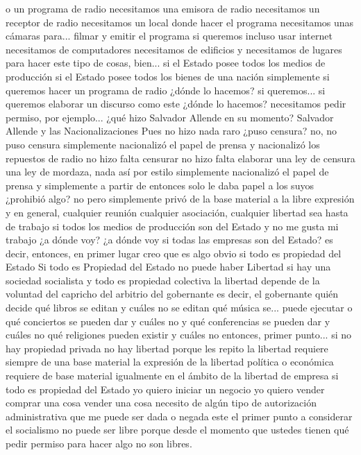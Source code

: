 o un programa de radio necesitamos una emisora de radio necesitamos un receptor de radio necesitamos un local donde hacer el programa
necesitamos unas cámaras para... filmar y emitir el programa si queremos incluso usar internet necesitamos de computadores
necesitamos de edificios y necesitamos de lugares para hacer este tipo de cosas, bien... si el Estado
posee todos los medios de producción si el Estado posee
todos los bienes de una nación simplemente si queremos hacer un programa de radio
¿dónde lo hacemos? si queremos... si queremos elaborar un discurso como este
¿dónde lo hacemos? necesitamos pedir permiso, por ejemplo... ¿qué hizo Salvador Allende en su momento?
Salvador Allende y las Nacionalizaciones
Pues no hizo nada raro ¿puso censura? no, no puso censura simplemente nacionalizó el papel de prensa
y nacionalizó los repuestos de radio no hizo falta censurar no hizo falta elaborar una ley de censura
una ley de mordaza, nada así por estilo simplemente nacionalizó el papel de prensa y simplemente a partir de entonces
solo le daba papel a los suyos ¿prohibió algo? no pero simplemente privó de la base material
a la libre expresión y en general, cualquier reunión cualquier asociación, cualquier libertad sea hasta de trabajo
si todos los medios de producción son del Estado y no me gusta mi trabajo ¿a dónde voy?
¿a dónde voy si todas las empresas son del Estado? es decir, entonces, en primer lugar creo que es algo obvio si todo es propiedad del Estado
Si todo es Propiedad del Estado no puede haber Libertad
si hay una sociedad socialista y todo es propiedad colectiva la libertad depende de la voluntad del capricho
del arbitrio del gobernante es decir, el gobernante quién decide qué libros se editan y cuáles no se editan
qué música se... puede ejecutar o qué conciertos se pueden dar y cuáles no y qué conferencias se pueden dar y cuáles no
qué religiones pueden existir y cuáles no entonces, primer punto... si no hay propiedad privada no hay libertad
porque les repito la libertad requiere siempre de una base material la expresión de la libertad
política o económica requiere de base material igualmente en el ámbito de la libertad de empresa
si todo es propiedad del Estado yo quiero iniciar un negocio yo quiero vender comprar una cosa vender una cosa necesito de algún tipo de autorización administrativa
que me puede ser dada o negada este el primer punto a considerar el socialismo no puede ser libre
porque desde el momento que ustedes tienen qué pedir permiso para hacer algo no son libres.


